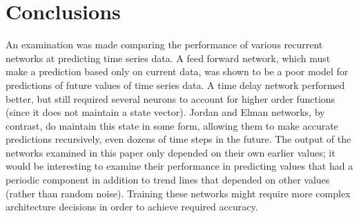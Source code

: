 \documentclass{IEEEtran}
\begin{document}
\section{Conclusions}
An examination was made comparing the performance of various recurrent networks at predicting time series data. A feed forward network, which must make a prediction based only on current data, was shown to be a poor model for predictions of future values of time series data. A time delay network performed better, but still required several neurons to account for higher order functions (since it does not maintain a state vector). Jordan and Elman networks, by contrast, do maintain this state in some form, allowing them to make accurate predictions recursively, even dozens of time steps in the future. The output of the networks examined in this paper only depended on their own earlier values; it would be interesting to examine their performance in predicting values that had a periodic component in addition to trend lines that depended on other values (rather than random noise). Training these networks might require more complex architecture decisions in order to achieve required accuracy.
\end{document}
